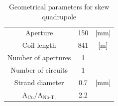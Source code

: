 \begin{table}[h!]
    \caption{Geometrical parameters for skew quadrupole \cite{hl_lhc_tech_design_report_v01, marco_prioli_mails}} 
    \vspace{-1.em} 
    \fontsize{10}{10}
    \selectfont 
    \renewcommand{\arraystretch}{1.5}
    \begin{center}
    \begin{tabular}{ ccc }  
    \hline
    Aperture & 150 & [mm]\\
    Coil length & 841 & [m] \\
    Number of apertures & 1 & \\
    Number of circuits & 1 & \\
    Strand diameter & 0.7 & [mm] \\
    $\text{A}_\text{Cu}/\text{A}_\text{Nb-Ti}$ \cite{marco_prioli_mails} & 2.2 & \\
    \hline 
    \end{tabular}
    \end{center}  
     \label{table:skew_quad_params_table} 
 \end{table}









